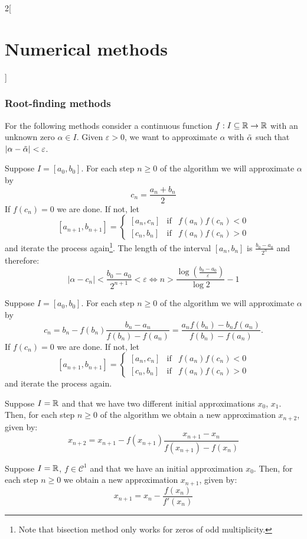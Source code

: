 \documentclass[../../../main.tex]{subfiles}
\begin{document}
\begin{multicols}{2}[\section{Numerical methods}]
  \subsubsection{Root-finding methods}
  For the following methods consider a continuous function $f:I\subseteq\mathbb{R}\rightarrow\mathbb{R}$ with an unknown zero $\alpha\in I$. Given $\varepsilon>0$, we want to approximate $\alpha$ with $\Tilde{\alpha}$ such that $|\alpha-\Tilde{\alpha}|<\varepsilon$.
  \begin{method}
    Suppose $I=[a_0,b_0]$. For each step $n\geq 0$ of the algorithm we will approximate $\alpha$ by $$c_n=\frac{a_n+b_n}{2}$$ If $f(c_n)=0$ we are done. If not, let
    $$[a_{n+1},b_{n+1}]=\left\{
      \begin{array}{ccc}
        [a_n,c_n]            & \text{if} & f(a_n)f(c_n)<0 \\
        \left[c_n,b_n\right] & \text{if} & f(a_n)f(c_n)>0
      \end{array}\right.$$
    and iterate the process again\footnote{Note that bisection method only works for zeros of odd multiplicity.}. The length of the interval $[a_n,b_n]$ is $\frac{b_0-a_0}{2^n}$ and therefore: $$|\alpha-c_n|<\frac{b_0-a_0}{2^{n+1}}<\varepsilon\iff n>\frac{\log\left(\frac{b_0-a_0}{\varepsilon}\right)}{\log 2}-1$$
  \end{method}
  \begin{method}
    Suppose $I=[a_0,b_0]$. For each step $n\geq 0$ of the algorithm we will approximate $\alpha$ by $$c_n=b_n-f(b_n)\frac{b_n-a_n}{f(b_n)-f(a_n)}=\frac{a_nf(b_n)-b_nf(a_n)}{f(b_n)-f(a_n)}.$$ If $f(c_n)=0$ we are done. If not, let
    $$[a_{n+1},b_{n+1}]=\left\{
      \begin{array}{ccc}
        [a_n,c_n]            & \text{if} & f(a_n)f(c_n)<0 \\
        \left[c_n,b_n\right] & \text{if} & f(a_n)f(c_n)>0
      \end{array}\right.$$
    and iterate the process again.
  \end{method}
  \begin{method}
    Suppose $I=\mathbb{R}$ and that we have two different initial approximations $x_0$, $x_1$. Then, for each step $n\geq 0$ of the algorithm we obtain a new approximation $x_{n+2}$, given by: $$x_{n+2}=x_{n+1}-f(x_{n+1})\frac{x_{n+1}-x_n}{f(x_{n+1})-f(x_n)}$$
  \end{method}
  \begin{method}
    Suppose $I=\mathbb{R}$, $f\in\mathcal{C}^1$ and that we have an initial approximation $x_0$. Then, for each step $n\geq 0$ we obtain a new approximation $x_{n+1}$, given by: $$x_{n+1}=x_n-\frac{f(x_n)}{f'(x_n)}$$

\end{method}
\end{multicols}
\end{document}
